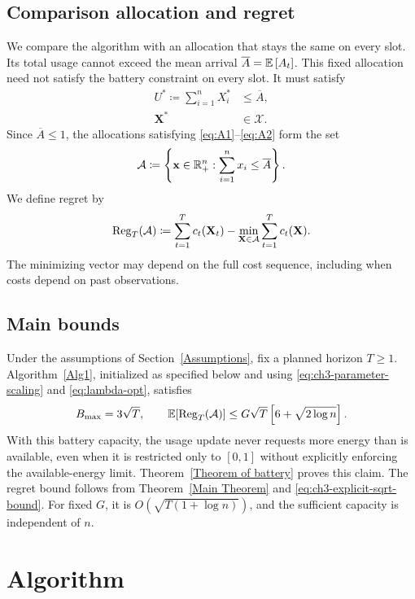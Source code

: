 \subsection{Comparison allocation and regret}

We compare the algorithm with an allocation that stays the same on every
slot. Its total usage cannot exceed the mean arrival
$\overline{A}=\mathbb{E}\left[A_t\right]$. This fixed allocation need not satisfy the
battery constraint on every slot. It must satisfy
\begin{align}
  U^*\coloneqq\sum_{i=1}^n X_i^*&\leq\overline{A}, \label{eq:A1}\\
  \mathbf{X}^*&\in\mathcal{X}. \label{eq:A2}
\end{align}
Since $\overline A\leq1$, the allocations satisfying
\eqref{eq:A1}--\eqref{eq:A2} form the set
\begin{equation}\label{eq:energy:comparison-set}
  \mathcal A\coloneqq\left\{\mathbf x\in\mathbb{R}_+^n:
    \sum_{i=1}^n x_i\leq\overline A\right\}.
\end{equation}
We define regret by
\begin{equation}
\label{eq:ch3-regret-definition}
  \mathrm{Reg}_T(\mathcal A)
  \coloneqq\sum_{t=1}^T c_t(\mathbf{X}_t)
    -\min_{\mathbf{X}\in\mathcal{A}}\sum_{t=1}^T c_t(\mathbf{X}).
\end{equation}
The minimizing vector may depend on the full cost sequence, including when
costs depend on past observations.

\subsection{Main bounds}\label{sec:energy:main-bounds}

Under the assumptions of Section~\ref{Assumptions}, fix a planned horizon
$T\geq1$. Algorithm~\ref{Alg1}, initialized as specified below and using
\eqref{eq:ch3-parameter-scaling} and \eqref{eq:lambda-opt}, satisfies
\[
 B_{\mathrm{max}}=3\sqrt T,\qquad
 \mathbb{E}[\mathrm{Reg}_T(\mathcal A)]
 \leq G\sqrt T\left[6+\sqrt{2\log n}\right].
\]
With this battery capacity, the usage update never requests more energy
than is available, even when it is restricted only to $[0,1]$ without
explicitly enforcing the available-energy limit.
Theorem~\ref{Theorem of battery} proves this claim. The regret bound follows from
Theorem~\ref{Main Theorem} and \eqref{eq:ch3-explicit-sqrt-bound}.
For fixed $G$, it is $O(\sqrt{T(1+\log n)})$, and the sufficient capacity
is independent of $n$.

\section{Algorithm}
\label{ALGorithm}

